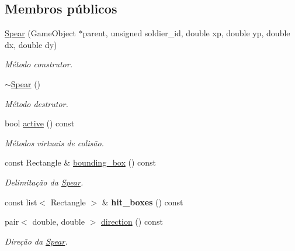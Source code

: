 \subsection*{Membros públicos}
\begin{DoxyCompactItemize}
\item 
\mbox{\hyperlink{classSpear_a4c5d78dcf2ede1706e020394ef72a2c4}{Spear}} (Game\+Object $\ast$parent, unsigned soldier\+\_\+id, double xp, double yp, double dx, double dy)
\begin{DoxyCompactList}\small\item\em Método construtor. \end{DoxyCompactList}\item 
\mbox{\hyperlink{classSpear_a22de46c86af13969a9a1a3f4db5bbde7}{$\sim$\+Spear}} ()
\begin{DoxyCompactList}\small\item\em Método destrutor. \end{DoxyCompactList}\item 
bool \mbox{\hyperlink{classSpear_aff16da1572b3e683d83c3a9bcfddbd50}{active}} () const
\begin{DoxyCompactList}\small\item\em Métodos virtuais de colisão. \end{DoxyCompactList}\item 
\mbox{\label{classSpear_a3e10056b0d810137a5df4a4830726f57}} 
const Rectangle \& \mbox{\hyperlink{classSpear_a3e10056b0d810137a5df4a4830726f57}{bounding\+\_\+box}} () const
\begin{DoxyCompactList}\small\item\em Delimitação da \mbox{\hyperlink{classSpear}{Spear}}. \end{DoxyCompactList}\item 
\mbox{\label{classSpear_ad633d9950ab0bb517d15064126ba5735}} 
const list$<$ Rectangle $>$ \& {\bfseries hit\+\_\+boxes} () const
\item 
\mbox{\label{classSpear_a21feee4e84706b71c1e63f3d9deb1e69}} 
pair$<$ double, double $>$ \mbox{\hyperlink{classSpear_a21feee4e84706b71c1e63f3d9deb1e69}{direction}} () const
\begin{DoxyCompactList}\small\item\em Direção da \mbox{\hyperlink{classSpear}{Spear}}. \end{DoxyCompactList}\end{DoxyCompactItemize}
